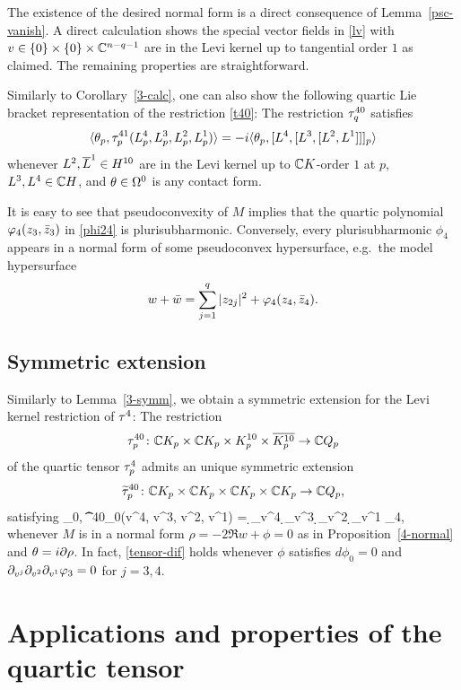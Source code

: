 \documentclass[12pt]{amsart}
\begin{document}
\bpf
The existence of the desired normal form 
is a direct consequence of Lemma~\ref{psc-vanish}.
A direct calculation shows the special vector fields in \eqref{lv}
with $v\in \{0\} \times \{0\} \times {\mathbb{C}}^{n-q-1}$ are in the Levi kernel up to tangential order $1$
as claimed.
The remaining properties are straightforward. 
\epf


Similarly to Corollary~\ref{3-calc},
one can also show the following quartic Lie bracket
representation of the restriction 
\eqref{t40}:
\bl
The restriction $\tau^{40}_q$
satisfies
$$
	\langle \theta_p, \tau^{41}_p(L^4_p, L^3_p, L^2_p, L^1_p)\rangle 
	= -i\langle \theta_p, [L^4, [L^3, [L^2, L^1]]]_p\rangle
$$
whenever $L^2, \overline{L}^1\in H^{10}$ are in the Levi kernel
up to ${\mathbb{C}} K$-order $1$ at $p$, $L^3, L^4\in {\mathbb{C}} H$,
and $\theta\in \Omega^0$ is any contact form.
\el


\br
It is easy to see that pseudoconvexity of $M$ implies that the quartic polynomial 
$\varphi_4(z_3,{\bar z}_3)$ in \eqref{phi24} is plurisubharmonic. 
Conversely, every plurisubharmonic $\phi_4$ appears
in a normal form of some pseudoconvex hypersurface,
e.g.\ the model hypersurface 
$$
	w+ {\bar w} = \sum_{j=1}^q |z_{2j}|^2  + \varphi_4(z_4, {\bar z}_4).
$$
\er

\subsection{Symmetric extension}
Similarly to Lemma~\ref{3-symm}, we obtain a symmetric extension
for the Levi kernel restriction of $\tau^4$:
\bl{}
The restriction 
$$
	\tau^{40}_p \colon {\mathbb{C}} K_p\times  {\mathbb{C}} K_p \times K^{10}_p\times \overline{K^{10}_p} \to {\mathbb{C}} Q_p
$$ 
of the quartic tensor $\tau^4_p$
 admits an unique symmetric extension
$$
	\widetilde{\tau}^{40}_p \colon
	{\mathbb{C}} K_p \times {\mathbb{C}} K_p\times {\mathbb{C}} K_p \times {\mathbb{C}} K_p \to {\mathbb{C}} Q_p,
$$
satisfying
\beq{}
	\la \th_0,  \2\t^{40}_0(v^4, v^3, v^2, v^1) \ra
	= \d_{v^4} \d_{v^3} \d_{v^2} \d_{v^1} \phi_4,
\eeq
whenever $M$ is in a normal form $\rho= -2\Re w +\phi=0$
as in Proposition~\ref{4-normal}
and $\theta = i\partial\rho$.
In fact, \eqref{tensor-dif}
holds whenever
$\phi$
satisfies $d\phi_0=0$
and 
$ \partial_{v^j} \partial_{v^2} \partial_{v^1} \varphi_3=0$
for $j=3,4$.
\el




\section{Applications and properties of the quartic tensor}
\end{document}

